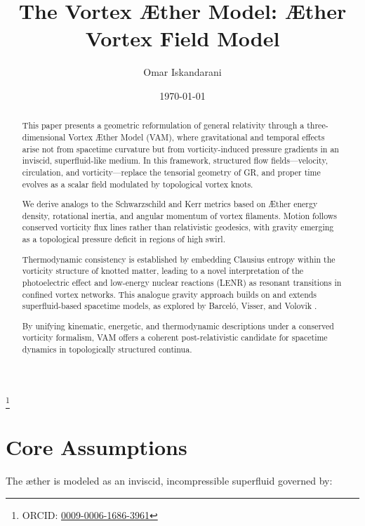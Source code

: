 \documentclass[aps,preprint,superscriptaddress]{revtex4}
\begin{document}
\sloppy
\author{Omar Iskandarani}
\title{The Vortex Æther Model: Æther Vortex Field Model}
\date{\today}
\thanks{ORCID: \href{https://orcid.org/0009-0006-1686-3961}{0009-0006-1686-3961}}




    \begin{abstract}
        This paper presents a geometric reformulation of general relativity through a three-dimensional Vortex Æther Model (VAM), where gravitational and temporal effects arise not from spacetime curvature but from vorticity-induced pressure gradients in an inviscid, superfluid-like medium. In this framework, structured flow fields—velocity, circulation, and vorticity—replace the tensorial geometry of GR, and proper time evolves as a scalar field modulated by topological vortex knots.

        We derive analogs to the Schwarzschild and Kerr metrics based on Æther energy density, rotational inertia, and angular momentum of vortex filaments. Motion follows conserved vorticity flux lines rather than relativistic geodesics, with gravity emerging as a topological pressure deficit in regions of high swirl.

        Thermodynamic consistency is established by embedding Clausius entropy within the vorticity structure of knotted matter, leading to a novel interpretation of the photoelectric effect and low-energy nuclear reactions (LENR) as resonant transitions in confined vortex networks. This analogue gravity approach builds on and extends superfluid-based spacetime models, as explored by Barceló, Visser, and Volovik \cite{barcelo2011analogue, volovik2009universe}.

        By unifying kinematic, energetic, and thermodynamic descriptions under a conserved vorticity formalism, VAM offers a coherent post-relativistic candidate for spacetime dynamics in topologically structured continua.
    \end{abstract}



    \maketitle

    \section*{Core Assumptions}
        The æther is modeled as an inviscid, incompressible superfluid governed by:
\end{document}
